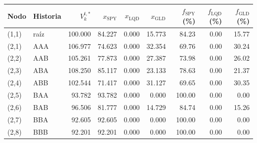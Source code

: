 {\small
\begin{tabular}{llrrrrrrr}
\toprule
Nodo & Historia & $V^{t,*}_k$ & $x_{\mathrm{SPY}}$ & $x_{\mathrm{LQD}}$ & $x_{\mathrm{GLD}}$ & $f_{\mathrm{SPY}}$ (\%) & $f_{\mathrm{LQD}}$ (\%) & $f_{\mathrm{GLD}}$ (\%) \\
\midrule
(1,1) & raíz & 100.000 & 84.227 & 0.000 & 15.773 & 84.23 & 0.00 & 15.77 \\
(2,1) & AAA & 106.977 & 74.623 & 0.000 & 32.354 & 69.76 & 0.00 & 30.24 \\
(2,2) & AAB & 105.261 & 77.873 & 0.000 & 27.387 & 73.98 & 0.00 & 26.02 \\
(2,3) & ABA & 108.250 & 85.117 & 0.000 & 23.133 & 78.63 & 0.00 & 21.37 \\
(2,4) & ABB & 102.544 & 71.417 & 0.000 & 31.127 & 69.65 & 0.00 & 30.35 \\
(2,5) & BAA & 93.782 & 93.782 & 0.000 & 0.000 & 100.00 & 0.00 & 0.00 \\
(2,6) & BAB & 96.506 & 81.777 & 0.000 & 14.729 & 84.74 & 0.00 & 15.26 \\
(2,7) & BBA & 92.605 & 92.605 & 0.000 & 0.000 & 100.00 & 0.00 & 0.00 \\
(2,8) & BBB & 92.201 & 92.201 & 0.000 & 0.000 & 100.00 & 0.00 & 0.00 \\
\bottomrule
\end{tabular}
}
